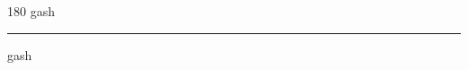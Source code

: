 
\begin{frame}
\begin{center}
\begin{turn}{180}
{\fontsize{2.5cm}{1em}\selectfont gash}
\end{turn}
\vspace{1em}\par  
\hrule
\vspace{1em}\par  
{\fontsize{2.5cm}{1em}\selectfont gash}
\end{center}
\end{frame}
